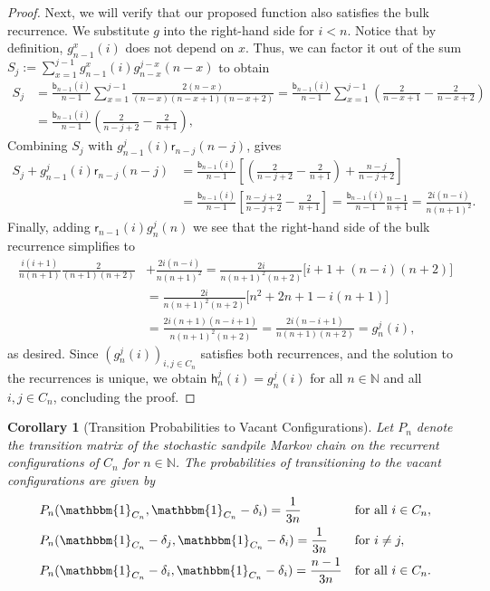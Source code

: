 \documentclass[11pt]{article}
\newtheorem{corollary}{Corollary}[section]
\newcommand{\N}{\mathbb{N}}
\newcommand{\one}{\mathbbm{1}}
\newcommand{\sgrright}[2]{\mathsf{r}_{#1}(#2)}
\newcommand{\sgrboth}[2]{\mathsf{b}_{#1}(#2)}
\newcommand{\trans}[1]{P_{#1}}
\begin{document}
\begin{proof}
    Next, we will verify that our proposed function also satisfies the bulk recurrence. We substitute $g$ into the right-hand side for $i < n$. Notice that by definition, $g_{n-1}^x(i)$ does not depend on $x$. Thus, we can factor it out of the sum $S_j := \sum_{x=1}^{j-1} g_{n-1}^x(i)g_{n-x}^{j-x}(n-x)$ to obtain
    \begin{align*}
        S_j &= \frac{\sgrboth{n-1}{i}}{n-1} \sum_{x=1}^{j-1} \frac{2(n-x)}{(n-x)(n-x+1)(n-x+2)} = \frac{\sgrboth{n-1}{i}}{n-1} \sum_{x=1}^{j-1} \left( \frac{2}{n-x+1} - \frac{2}{n-x+2} \right) \\&= \frac{\sgrboth{n-1}{i}}{n-1} \left( \frac{2}{n-j+2} - \frac{2}{n+1} \right),
    \end{align*}
    Combining $S_j$ with $g_{n-1}^j(i)\sgrright{n-j}{n-j}$, gives
    \begin{align*}
        S_j + g_{n-1}^j(i)\sgrright{n-j}{n-j} &= \frac{\sgrboth{n-1}{i}}{n-1} \left[ \left( \frac{2}{n-j+2} - \frac{2}{n+1} \right) + \frac{n-j}{n-j+2} \right] \\
        &= \frac{\sgrboth{n-1}{i}}{n-1} \left[ \frac{n-j+2}{n-j+2} - \frac{2}{n+1} \right] = \frac{\sgrboth{n-1}{i}}{n-1} \frac{n-1}{n+1} = \frac{2i(n-i)}{n(n+1)^2}.
    \end{align*}
    Finally, adding $\sgrright{n-1}{i}g_n^j(n)$ we see that the right-hand side of the bulk recurrence simplifies to
    \begin{align*}
        \frac{i(i+1)}{n(n+1)}   \frac{2}{(n+1)(n+2)}  &+ \frac{2i(n-i)}{n(n+1)^2}
        = \frac{2i}{n(n+1)^2(n+2)} \Big[ i + 1 + (n-i)(n+2) \Big] \\
        &= \frac{2i}{n(n+1)^2(n+2)} \Big[ n^2 + 2n + 1 - i(n+1) \Big] \\
        &= \frac{2i(n+1)(n-i+1)}{n(n+1)^2(n+2)} = \frac{2i(n-i+1)}{n(n+1)(n+2)} = g_n^j(i),
    \end{align*}
    as desired.
    Since $(g_n^j(i))_{i,j\in C_n}$ satisfies both recurrences, and the solution to the recurrences is unique, we obtain $\mathsf{h}_n^j(i) = g_n^j(i)$ for all $n\in\N$ and all $i,j\in C_n$, concluding the proof.
\end{proof}
\begin{corollary}[Transition Probabilities to Vacant Configurations]\label{cor:hole-transitions}
    Let $\trans{n}$ denote the transition matrix of the stochastic sandpile Markov chain on the recurrent configurations of $C_n$ for $n\in\N$. The probabilities of transitioning to the vacant configurations are given by
    \begin{align*}
        &\trans{n}(\one_{C_n}, \one_{C_n} - \delta_i) = \frac{1}{3n} \quad &&\text{for all } i \in C_n,  \\
        &\trans{n}(\one_{C_n} - \delta_j, \one_{C_n} - \delta_i) = \frac{1}{3n} \quad &&\text{for } i \neq j,  \\
        &\trans{n}(\one_{C_n} - \delta_i, \one_{C_n} - \delta_i) = \frac{n-1}{3n} &&\text{for all }i\in C_n.
    \end{align*}
\end{corollary}
\end{document}
